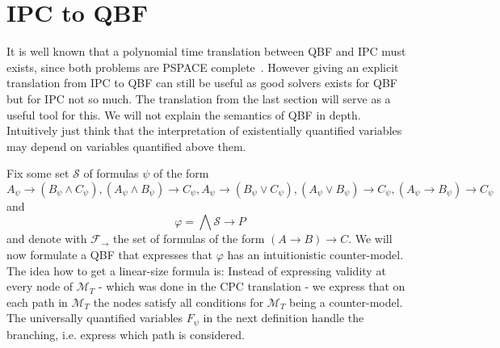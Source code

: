\documentclass[a4paper,UKenglish,cleveref, autoref, thm-restate]{lipics-v2021}
\begin{document}
\section{IPC to QBF}

It is well known that a polynomial time translation between QBF and IPC must exists, since both problems are PSPACE complete~\cite{garey1979computers, statman1979intuitionistic}. However giving an explicit translation from IPC to QBF can still be useful as good solvers exists for QBF but for IPC not so much. The translation from the last section will serve as a useful tool for this. We will not explain the semantics of QBF in depth. Intuitively just think that the interpretation of existentially quantified variables may depend on variables quantified above them.

Fix some set $\mathcal S$ of formulas $\psi$ of the form $$A_\psi\to (B_\psi\wedge C_\psi), (A_\psi\wedge B_\psi)\to C_\psi, A_\psi\to (B_\psi\vee C_\psi), (A_\psi\vee B_\psi)\to C_\psi, (A_\psi\to B_\psi)\to C_\psi$$and$$\varphi = \bigwedge \mathcal S\to P$$
and denote with $\mathcal F_\to$ the set of formulas of the form $(A\to B)\to C$. We will now formulate a QBF that expresses that $\varphi$ has an intuitionistic counter-model. The idea how to get a linear-size formula is: Instead of expressing validity at every node of $\mathcal M_T$ - which was done in the CPC translation - we express that on each path in $\mathcal M_T$ the nodes satisfy all conditions for $\mathcal M_T$ being a counter-model. The universally quantified variables $F_\psi$ in the next definition handle the branching, i.e. express which path is considered.
\end{document}
